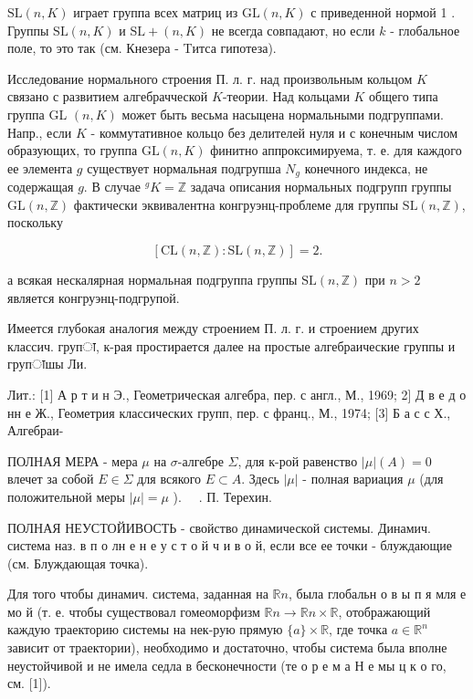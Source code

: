 \documentclass[10pt]{article}
\begin{document}
$\mathrm{SL}(n, K)$ играет группа всех матриц из $\mathrm{GL}(n, K)$ с приведенной нормой 1 . Группы $\mathrm{SL}(n, K)$ и $\mathrm{SL}+(n, K)$ не всегда совпадают, но если $k$ - глобальное поле, то это так (см. Кнезера - Tитса гипотеза).



Исследование нормального строения П. л. г. над произвольным кольцом $K$ связано с развитием алгебрачческой $K$-теории. Над кольцами $K$ общего типа группа GL $(n, K)$ может быть весьма насыцена нормальными подгруппами. Напр., если $K$ - коммутативное кольцо без делителей нуля и с конечным числом образующих, то группа $\mathrm{GL}(n, K)$ финитно аппроксимируема, т. е. для каждого ее элемента $g$ существует нормальная подгрупша $N_{g}$ конечного индекса, не содержащая $g$. В случае ${ }^{g} K=\mathbb{Z}$ задача описания нормальных подгрупп группы $\mathrm{GL}(n, \mathbb{Z})$ фактически эквивалентна конгруэнц-проблеме для группы $\mathrm{SL}(n, \mathbb{Z})$, поскольку



\[

[\mathrm{CL}(n, \mathbb{Z}): \mathrm{SL}(n, \mathbb{Z})]=2 .

\]



а всякая нескалярная нормальная подгруппа группы $\mathrm{SL}(n, \mathbb{Z})$ при $n>2$ является конгруэнц-подгрупой.



Имеется глубокая аналогия между строением П. л. г. и строением других классич. групा, к-рая простирается далее на простые алгебраические группы и групाшы Ли.



Лит.: [1] А р т и н Э., Геометрическая алгебра, пер. с англ., М., 1969; 2] Д в е д о нн е Ж., Геометрия классических групп, пер. с франц., М., 1974; [3] Б а с с Х., Алгебраи-



ПОЛНАЯ МЕРА - мера $\mu$ на $\sigma$-алгебре $\Sigma$, для к-рой равенство $|\mu|(A)=0$ влечет за собой $E \in \Sigma$ для всякого $E \subset A$. Здесь $|\mu|$ - полная вариация $\mu$ (для положительной меры $|\mu|=\mu$ ). $\quad$. П. Терехин.



ПОЛНАЯ НЕУСТОЙИВОСТЬ - свойство динамической системы. Динамич. система наз. в п о лн е н е у с т о й ч и в о й, если все ее точки - блуждающие (см. Блуждающая точка).



Для того чтобы динамич. система, заданная на $\mathbb{R} n$, была глобальн о в ы п я мля е мо й (т. е. чтобы существовал гомеоморфизм $\mathbb{R} n \rightarrow \mathbb{R} n \times \mathbb{R}$, отображающий каждую траекторию системы на нек-рую прямую $\{a\} \times \mathbb{R}$, где точка $a \in \mathbb{R}^{n}$ зависит от траектории), необходимо и достаточно, чтобы система была вполне неустойчивой и не имела седла в бесконечности (те о р е м а Н е мы ц к о го, см. [1]).
\end{document}
